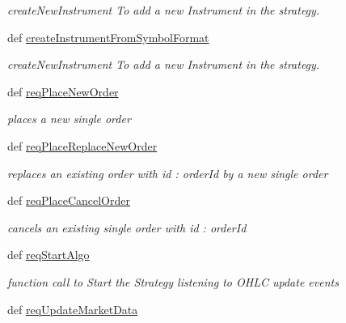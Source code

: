 \begin{DoxyCompactItemize}
\begin{DoxyCompactList}\small\item\em createNewInstrument To add a new Instrument in the strategy. \item\end{DoxyCompactList}\item 
def \hyperlink{classmuTradePyBase_1_1CustomStrategy_ab198cb371a98954673637288d3ab07c8}{createInstrumentFromSymbolFormat}
\begin{DoxyCompactList}\small\item\em createNewInstrument To add a new Instrument in the strategy. \item\end{DoxyCompactList}\item 
def \hyperlink{classmuTradePyBase_1_1CustomStrategy_ade3e0161fb897eed61c2ac3e1823ff8f}{reqPlaceNewOrder}
\begin{DoxyCompactList}\small\item\em places a new single order \item\end{DoxyCompactList}\item 
def \hyperlink{classmuTradePyBase_1_1CustomStrategy_aa6cbf9a067fcc64004f847d80913621c}{reqPlaceReplaceNewOrder}
\begin{DoxyCompactList}\small\item\em replaces an existing order with id : orderId by a new single order \item\end{DoxyCompactList}\item 
def \hyperlink{classmuTradePyBase_1_1CustomStrategy_a960f1c0ee467c21a732e1ae080b39dcb}{reqPlaceCancelOrder}
\begin{DoxyCompactList}\small\item\em cancels an existing single order with id : orderId \item\end{DoxyCompactList}\item 
def \hyperlink{classmuTradePyBase_1_1CustomStrategy_a67ba152e8e50acf69bc02ca08088bb0a}{reqStartAlgo}
\begin{DoxyCompactList}\small\item\em function call to Start the Strategy listening to OHLC update events \item\end{DoxyCompactList}\item 
def \hyperlink{classmuTradePyBase_1_1CustomStrategy_a25d6d4941b75233ee3c126c8ff9def54}{reqUpdateMarketData}

\end{DoxyCompactItemize}
